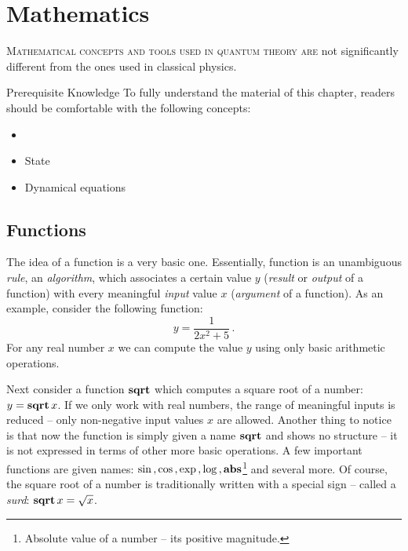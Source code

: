\graphicspath{{../03Mathematics/pics/}}

\chapter{Mathematics}\label{ch:Mathematics}

\lettrine[lines=2]{\color{darkocre}M}{athematical concepts and tools used in quantum theory are} not significantly different from the ones used in classical physics.

\begin{myprereq}{Prerequisite Knowledge}
	To fully understand the material of this chapter, readers should be comfortable with the following concepts:
	
	\begin{itemize}
		\item \phantom{phantom}
		\vspace{-0.5cm}
		\item State
		\item Dynamical equations
	\end{itemize}	
\end{myprereq}



\section{Functions}

The idea of a function is a very basic one. Essentially, function is an unambiguous \emph{rule}, an \emph{algorithm}, which associates a certain value $y$ (\emph{result} or \emph{output} of a function) with every meaningful \emph{input} value $x$ (\emph{argument} of a function). As an example, consider the following  function:
\[
y=\frac{1}{2x^2+5}\,.
\]
For any real number $x$ we can compute the value $y$ using only basic arithmetic operations. 

Next consider a function $\textrm{\bf {sqrt}}$ which computes a square root of a number: $y=\textrm{\bf {sqrt}}\,x$. If we only work with real numbers, the range of meaningful inputs is reduced -- only non-negative input values $x$ are allowed. Another thing to notice is that now the function is simply given a name  $\textrm{\bf {sqrt}}$  and shows no structure -- it is not expressed in terms of other more basic operations. A few important functions are given names: 
$\sin\,,\cos\,,\exp\,,\log\,,\textrm{\bf {abs}}$\footnote{Absolute value of a number -- its positive magnitude.} and several more. Of course, the square root of a number is traditionally written with a special sign -- called a \emph{surd}: $\textrm{\bf {sqrt}}\,x=\sqrt{x}$.

